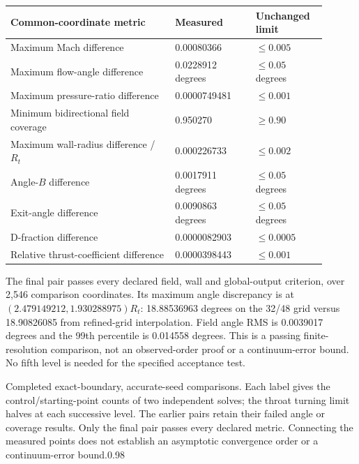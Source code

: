 \begin{longtable}{@{}P{0.47\linewidth}P{0.23\linewidth}P{0.20\linewidth}@{}}
\toprule\textbf{Common-coordinate metric} & \textbf{Measured} & \textbf{Unchanged limit}\\\midrule
\endhead
Maximum Mach difference & 0.00080366 & $\leq0.005$\\
Maximum flow-angle difference & 0.0228912 degrees & $\leq0.05$ degrees\\
Maximum pressure-ratio difference & 0.0000749481 & $\leq0.001$\\
Minimum bidirectional field coverage & 0.950270 & $\geq0.90$\\
Maximum wall-radius difference / $R_t$ & 0.000226733 & $\leq0.002$\\
Angle-$B$ difference & 0.0017911 degrees & $\leq0.05$ degrees\\
Exit-angle difference & 0.0090863 degrees & $\leq0.05$ degrees\\
D-fraction difference & 0.0000082903 & $\leq0.0005$\\
Relative thrust-coefficient difference & 0.0000398443 & $\leq0.001$\\
\bottomrule
\end{longtable}

The final pair passes every declared field, wall and global-output criterion,
over 2,546 comparison coordinates. Its maximum angle discrepancy is at
$(2.479149212,1.930288975)R_t$: 18.88536963 degrees on the 32/48 grid
versus 18.90826085 from refined-grid interpolation. Field angle RMS is
0.0039017 degrees and the 99th percentile is 0.014558 degrees.
This is a passing finite-resolution comparison, not an observed-order
proof or a continuum-error bound. No fifth level is needed for the
specified acceptance test.

{Completed exact-boundary, accurate-seed comparisons. Each label gives the
control/starting-point counts of two independent solves; the throat turning
limit halves at each successive level. The earlier pairs retain their failed
angle or coverage results. Only the final pair passes every declared metric.
Connecting the measured points does not establish an asymptotic convergence
order or a continuum-error bound.}{0.98}

